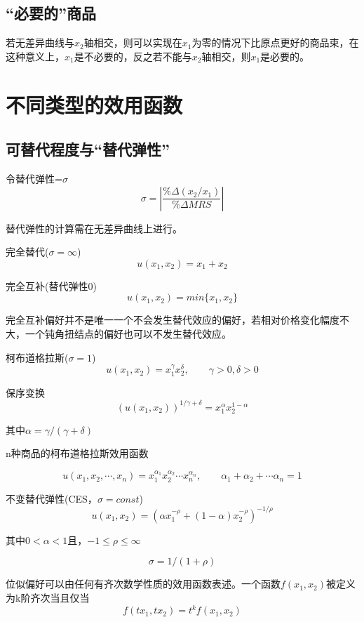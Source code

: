 \documentclass{article}
\begin{document}
\subsection{“必要的”商品}
若无差异曲线与$ x_2 $轴相交，则可以实现在$ x_1 $为零的情况下比原点更好的商品束，在这种意义上，$ x_1 $是不必要的，反之若不能与$ x_2 $轴相交，则$ x_1 $是必要的。

\section{不同类型的效用函数}
\subsection{可替代程度与“替代弹性”}
令替代弹性=$ \sigma $
\[
\sigma=\left|\frac{\%\Delta(x_2/x_1)}{\%\Delta MRS}\right|
\]

替代弹性的计算需在无差异曲线上进行。

\hspace*{\fill}

完全替代($ \sigma=\infty $)
\[
u(x_1,x_2)=x_1+x_2
\]

\hspace*{\fill}

完全互补(替代弹性0)
\[
u(x_1,x_2)=min\{x_1,x_2\}
\]

完全互补偏好并不是唯一一个不会发生替代效应的偏好，若相对价格变化幅度不大，一个钝角扭结点的偏好也可以不发生替代效应。

\hspace*{\fill}

柯布道格拉斯($ \sigma=1 $)
\[
u(x_1,x_2)=x_1^\gamma x_2^\delta,\qquad \gamma>0,\delta>0
\]

保序变换
\[
(u(x_1,x_2))^{1/\gamma+\delta}=x_1^\alpha x_2^{1-\alpha}
\]

其中$ \alpha=\gamma/(\gamma+\delta) $

n种商品的柯布道格拉斯效用函数

\[
u(x_1,x_2,\cdots,x_n)=x_1^{\alpha_1}x_2^{\alpha_2}\cdots x_n^{\alpha_n},\qquad \alpha_1+\alpha_2+\cdots\alpha_n=1
\]

\hspace*{\fill}

不变替代弹性(CES，$ \sigma=const $)
\[
u(x_1,x_2)=(\alpha x_1^{-\rho}+(1-\alpha)x_2^{-\rho})^{-1/\rho}
\]

其中$ 0<\alpha<1 $且，$ -1\le\rho\le\infty $

\[
\sigma=1/(1+\rho)
\]

位似偏好可以由任何有齐次数学性质的效用函数表述。一个函数$ f(x_1,x_2) $被定义为k阶齐次当且仅当
\[
f(tx_1,tx_2)=t^kf(x_1,x_2)
\]
\end{document}
